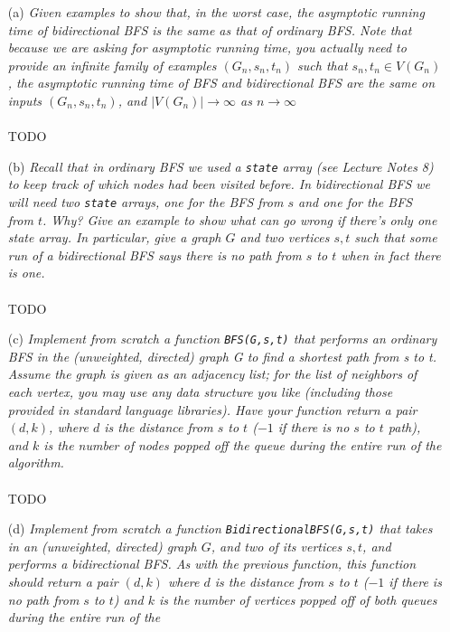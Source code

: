 \documentclass[12pt]{article} \setlength{\oddsidemargin}{0in}
\begin{document}
\begin{enumerate}
\item[(a)]{\textit{Given examples to show that, in the worst case, the asymptotic running time of
bidirectional BFS is the same as that of ordinary BFS. Note that because we are
asking for asymptotic running time, you actually need to provide an infinite family
of examples $(G_n , s_n , t_n )$ such that $s_n, t_n \in V(G_n)$, the asymptotic running time of
BFS and bidirectional BFS are the same on inputs $(G_n, s_n, t_n)$, and $|V(G_n)| \rightarrow \infty$ as $n \rightarrow \infty$}}
  \\\\
  TODO
  \\
\item[(b)]{\textit{Recall that in ordinary BFS we used a \texttt{state} array (see Lecture Notes 8) to keep track of which nodes had been visited before. In bidirectional BFS we will need two
\texttt{state} arrays, one for the BFS from $s$ and one for the BFS from $t$. Why? Give an
example to show what can go wrong if there’s only one state array. In particular,
give a graph $G$ and two vertices $s, t$ such that some run of a bidirectional BFS
says there is no path from $s$ to $t$ when in fact there is one.}}
  \\\\
  TODO
  \\
  \item[(c)]{\textit{Implement from scratch a function \texttt{BFS(G,s,t)} that performs an ordinary BFS in the (unweighted, directed) graph G to find a shortest path from s to t. Assume
the graph is given as an adjacency list; for the list of neighbors of each vertex,
you may use any data structure you like (including those provided in standard
language libraries). Have your function return a pair $(d, k)$, where $d$ is the distance
from $s$ to $t$ ($-1$ if there is no $s$ to $t$ path), and $k$ is the number of nodes popped
off the queue during the entire run of the algorithm.}}
  \\\\
  TODO
  \\
\item[(d)]{\textit{Implement from scratch a function \texttt{BidirectionalBFS(G,s,t)} that takes in an (unweighted, directed) graph $G$, and two of its vertices $s,t$, and performs a bidirectional BFS. As with the previous function, this function should return a pair
$(d, k)$ where $d$ is the distance from $s$ to $t$ ($-1$ if there is no path from $s$ to $t$) and $k$ is the number of vertices popped off of both queues during the entire run of the
}}
\end{enumerate}
\end{document}
